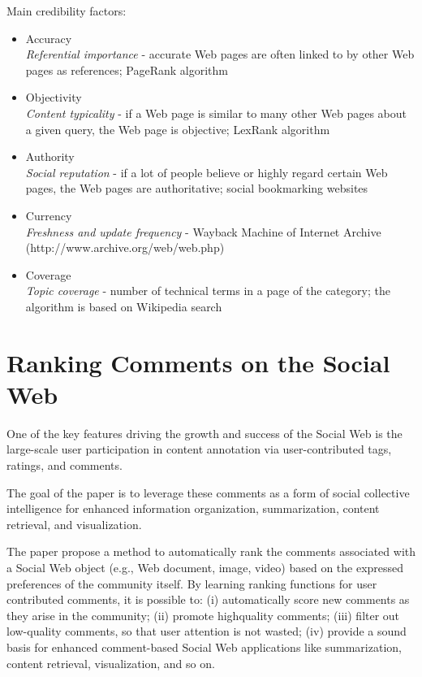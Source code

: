 \documentclass{article}
\begin{document}
Main credibility factors:

\begin{itemize}
\item Accuracy \\
\textit{Referential importance} -  accurate Web pages are often linked to by
other Web pages as references; PageRank algorithm

\item Objectivity \\
\textit{Content typicality} - if a Web page is similar to many other Web
pages about a given query, the Web page is objective; LexRank algorithm 

\item Authority \\
\textit{Social reputation} - if a lot of people believe or highly regard certain Web pages, the Web pages are authoritative; social bookmarking websites

\item Currency \\
\textit{Freshness and update frequency} - Wayback Machine of Internet Archive (http://www.archive.org/web/web.php)

\item Coverage \\ 
\textit{Topic coverage} - number of technical terms in a page of the category; the algorithm is based on Wikipedia search 

\end{itemize}

\section{Ranking Comments on the Social Web  \cite{conf/cse/HsuKC09}}

One of the key features driving the growth and success of the Social Web is the large-scale user participation in content annotation via user-contributed tags, ratings, and comments.

The goal of the paper is to leverage these comments as a form of social collective intelligence for enhanced information organization, summarization, content retrieval, and visualization.

The paper propose a method to automatically rank the comments associated with a Social Web object (e.g., Web document, image, video) based on the expressed preferences of the community itself. By learning ranking functions for user contributed comments, it is possible to: (i) automatically score new comments as they arise in the community; (ii) promote highquality comments; (iii) filter out low-quality comments, so that user attention is not wasted; (iv) provide a sound basis for enhanced comment-based Social Web applications like summarization, content retrieval, visualization, and so on.
\end{document}
